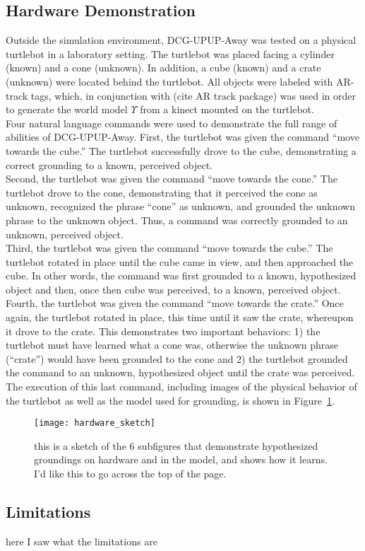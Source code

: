 \subsection{Hardware Demonstration}
Outside the simulation environment, DCG-UPUP-Away was tested on a physical turtlebot in a laboratory setting.
The turtlebot was placed facing a cylinder (known) and a cone (unknown).
In addition, a cube (known) and a crate (unknown) were located behind the turtlebot.
All objects were labeled with AR-track tags, which, in conjunction with (cite AR track package) was used in order to generate the world model $\Upsilon$ from a kinect mounted on the turtlebot.\\
\indent Four natural language commands were used to demonstrate the full range of abilities of DCG-UPUP-Away.
First, the turtlebot was given the command ``move towards the cube.''
The turtlebot successfully drove to the cube, demonstrating a correct grounding to a known, perceived object.\\
\indent Second, the turtlebot was given the command ``move towards the cone.''
The turtlebot drove to the cone, demonstrating that it perceived the cone as unknown, recognized the phrase ``cone'' as unknown, and grounded the unknown phrase to the unknown object.
Thus, a command was correctly grounded to an unknown, perceived object.\\
\indent Third, the turtlebot was given the command ``move towards the cube.''
The turtlebot rotated in place until the cube came in view, and then approached the cube.
In other words, the command was first grounded to a known, hypothesized object and then, once then cube was perceived, to a known, perceived object.\\
\indent Fourth, the turtlebot was given the command ``move towards the crate.''
Once again, the turtlebot rotated in place, this time until it saw the crate, whereupon it drove to the crate.
This demonstrates two important behaviors: 1) the turtlebot must have learned what a cone was, otherwise the unknown phrase (``crate'') would have been grounded to the cone and 2) the turtlebot grounded the command to an unknown, hypothesized object until the crate was perceived.
The execution of this last command, including images of the physical behavior of the turtlebot as well as the model used for grounding, is shown in Figure~\ref{fig:hardware_demo}.

\begin{figure}[ht]
\centering
\texttt{[image: hardware\_sketch]}
\caption{this is a sketch of the 6 subfigures that demonstrate hypothesized groundings on hardware and in the model, and shows how it learns. I'd like this to go across the top of the page.}
\label{fig:hardware_demo}
\end{figure}

\subsection{Limitations}
here I saw what the limitations are